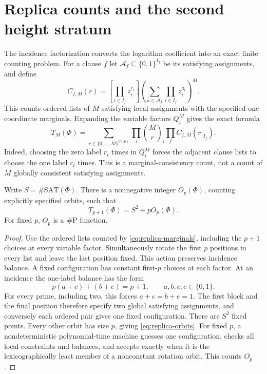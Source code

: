 \section{Replica counts and the second height stratum}
The incidence factorization converts the logarithm coefficient into an exact finite counting problem.
For a clause $f$ let $\mathcal A_f\subseteq\{0,1\}^{I_f}$ be its
satisfying assignments, and define
\[
 C_{f,M}(r)=
 [\prod_{i\in I_f}z_i^{r_i}]
 \left(\sum_{a\in\mathcal A_f}\prod_{i\in I_f}z_i^{a_i}\right)^M.
\]
This counts ordered lists of $M$ satisfying local assignments with
the specified one-coordinate marginals.  Expanding the variable
factors $Q_i^M$ gives the exact formula
\begin{equation}\label{eq:replica-marginals}
 T_M(\Phi)=\sum_{r\in\{0,\ldots,M\}^{V(\Phi)}}
       \prod_i\binom Mr_i\prod_f C_{f,M}(r|_{I_f}).
\end{equation}
Indeed, choosing the zero label $r_i$ times in $Q_i^M$ forces the
adjacent clause lists to choose the one label $r_i$ times.  This is a
marginal-consistency count, not a count of $M$ globally consistent
satisfying assignments.

\begin{proposition}
Write $S=\#\mathrm{SAT}(\Phi)$.  There is a nonnegative integer
$O_p(\Phi)$, counting explicitly specified orbits, such that
\begin{equation}\label{eq:replica-orbits}
 T_{p+1}(\Phi)=S^2+pO_p(\Phi).
\end{equation}
For fixed $p$, $O_p$ is a \#P function.
\end{proposition}
\begin{proof}
Use the ordered lists counted by \eqref{eq:replica-marginals}, including
the $p+1$ choices at every variable factor.  Simultaneously rotate the
first $p$ positions in every list and leave the last position fixed.
This action preserves incidence balance.  A fixed configuration has
constant first-$p$ choices at each factor.  At an incidence the one-label
balance has the form
\[
 p(a+c)+(b+e)=p+1,\qquad a,b,c,e\in\{0,1\}.
\]
For every prime, including two, this forces $a+c=b+e=1$.
The first block and the final position therefore specify two global
satisfying assignments, and conversely each ordered pair gives one
fixed configuration.  There are $S^2$ fixed points.  Every other orbit
has size $p$, giving \eqref{eq:replica-orbits}.
For fixed $p$, a nondeterministic polynomial-time machine guesses one
configuration, checks all local constraints and balances, and accepts
exactly when it is the lexicographically least member of a nonconstant
rotation orbit.  This counts $O_p$.
\end{proof}



